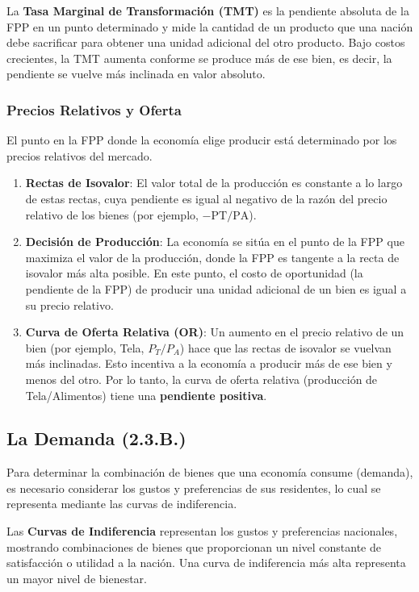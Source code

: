 \begin{definicion}
La \textbf{Tasa Marginal de Transformación (TMT)} es la pendiente absoluta de la FPP en un punto determinado y mide la cantidad de un producto que una nación debe sacrificar para obtener una unidad adicional del otro producto. Bajo costos crecientes, la TMT aumenta conforme se produce más de ese bien, es decir, la pendiente se vuelve más inclinada en valor absoluto.
\end{definicion}

\subsubsection{Precios Relativos y Oferta}
El punto en la FPP donde la economía elige producir está determinado por los precios relativos del mercado.

\begin{enumerate}
    \item \textbf{Rectas de Isovalor}: El valor total de la producción es constante a lo largo de estas rectas, cuya pendiente es igual al negativo de la razón del precio relativo de los bienes (por ejemplo, $-\text{PT}/\text{PA}$).
    \item \textbf{Decisión de Producción}: La economía se sitúa en el punto de la FPP que maximiza el valor de la producción, donde la FPP es tangente a la recta de isovalor más alta posible. En este punto, el costo de oportunidad (la pendiente de la FPP) de producir una unidad adicional de un bien es igual a su precio relativo.
    \item \textbf{Curva de Oferta Relativa (OR)}: Un aumento en el precio relativo de un bien (por ejemplo, Tela, $P_T/P_A$) hace que las rectas de isovalor se vuelvan más inclinadas. Esto incentiva a la economía a producir más de ese bien y menos del otro. Por lo tanto, la curva de oferta relativa (producción de Tela/Alimentos) tiene una \textbf{pendiente positiva}.
\end{enumerate}

\subsection{La Demanda (2.3.B.)}
Para determinar la combinación de bienes que una economía consume (demanda), es necesario considerar los gustos y preferencias de sus residentes, lo cual se representa mediante las curvas de indiferencia.

\begin{definicion}
Las \textbf{Curvas de Indiferencia} representan los gustos y preferencias nacionales, mostrando combinaciones de bienes que proporcionan un nivel constante de satisfacción o utilidad a la nación. Una curva de indiferencia más alta representa un mayor nivel de bienestar.
\end{definicion}

